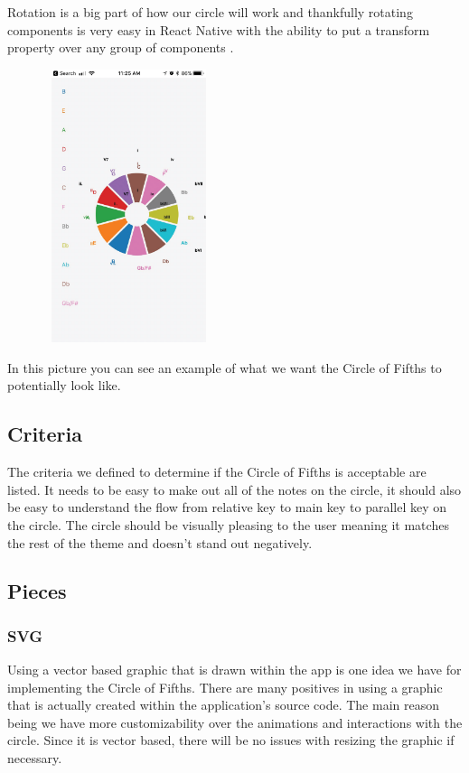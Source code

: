 \documentclass[onecolumn, draftclsnofoot,10pt, compsoc]{IEEEtran}
\begin{document}
Rotation is a big part of how our circle will work and thankfully rotating components is very easy in React Native with the ability to put a transform property over any group of components \cite{rntransform}.
 
\begin{figure}[H]
    \centering
    \includegraphics[width=5cm, height=8cm]{circle.eps}
\end{figure}

In this picture you can see an example of what we want the Circle of Fifths to potentially look like.

\subsection{Criteria}

The criteria we defined to determine if the Circle of Fifths is acceptable are listed.
It needs to be easy to make out all of the notes on the circle, it should also be easy to understand the flow from relative key to main key to parallel key on the circle.
The circle should be visually pleasing to the user meaning it matches the rest of the theme and doesn't stand out negatively.

\subsection{Pieces}
\subsubsection{SVG}

Using a vector based graphic that is drawn within the app is one idea we have for implementing the Circle of Fifths.
There are many positives in using a graphic that is actually created within the application's source code.
The main reason being we have more customizability over the animations and interactions with the circle.
Since it is vector based, there will be no issues with resizing the graphic if necessary. 
\end{document}
